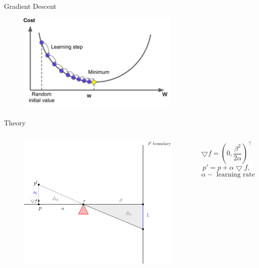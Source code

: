 \documentclass{beamer}
\begin{document}
\begin{frame}{Gradient Descent}
	\begin{figure}
		\centering
		\includegraphics[width = 0.7\textwidth]{Images/external-content.duckduckgo.com.jpeg}
	\end{figure}
\end{frame}

\begin{frame}{Theory}
		\begin{columns}[T, onlytextwidth] %
			\begin{figure}
				\includegraphics[width = \textwidth]{Images/gradient2.png}
			\end{figure}

			\centering
			$$\bigtriangledown f = \left(0, \frac{\beta^2}{2\alpha}\right)^\intercal$$
			$$p' = p + \alpha\bigtriangledown f,$$
			$$\alpha - \text{ learning rate}$$
	\end{columns}
\end{frame}
\end{document}
